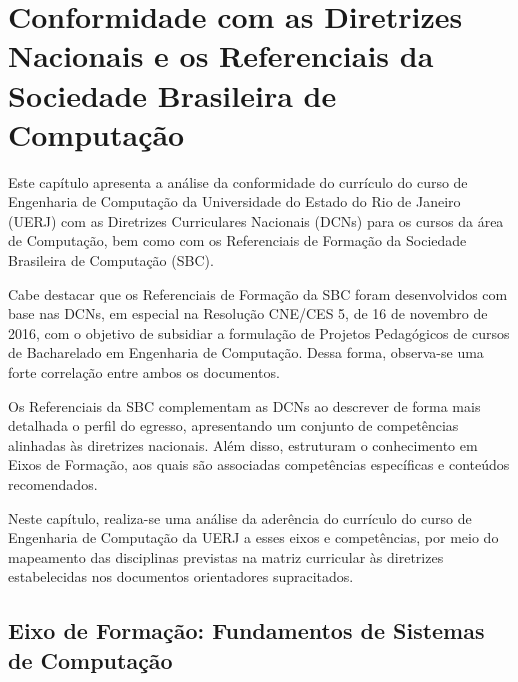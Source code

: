 \chapter{Conformidade com as Diretrizes Nacionais e os Referenciais da Sociedade Brasileira de Computação}

Este capítulo apresenta a análise da conformidade do currículo do curso de Engenharia de Computação da Universidade do Estado do Rio de Janeiro (UERJ) com as Diretrizes Curriculares Nacionais (DCNs) para os cursos da área de Computação, bem como com os Referenciais de Formação da Sociedade Brasileira de Computação (SBC).

Cabe destacar que os Referenciais de Formação da SBC foram desenvolvidos com base nas DCNs, em especial na Resolução CNE/CES  5, de 16 de novembro de 2016, com o objetivo de subsidiar a formulação de Projetos Pedagógicos de cursos de Bacharelado em Engenharia de Computação. Dessa forma, observa-se uma forte correlação entre ambos os documentos.

Os Referenciais da SBC complementam as DCNs ao descrever de forma mais detalhada o perfil do egresso, apresentando um conjunto de competências alinhadas às diretrizes nacionais. Além disso, estruturam o conhecimento em Eixos de Formação, aos quais são associadas competências específicas e conteúdos recomendados.

Neste capítulo, realiza-se uma análise da aderência do currículo do curso de Engenharia de Computação da UERJ a esses eixos e competências, por meio do mapeamento das disciplinas previstas na matriz curricular às diretrizes estabelecidas nos documentos orientadores supracitados.

\section{Eixo de Formação: Fundamentos de Sistemas de Computação}

